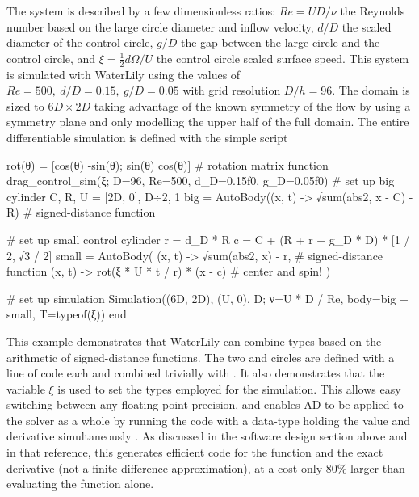 \documentclass[10pt,a4paper]{article}
\begin{document}
The system is described by a few dimensionless ratios: $Re=UD/\nu$ the Reynolds number based on the large circle diameter and inflow velocity, $d/D$ the scaled diameter of the control circle, $g/D$ the gap between the large circle and the control circle, and $\xi=\frac 12 d\Omega/U$ the control circle scaled surface speed. This system is simulated with WaterLily using the values of $Re=500,\ d/D=0.15,\ g/D=0.05$ with grid resolution $D/h=96$. The domain is sized to $6D\times2D$ taking advantage of the known symmetry of the flow by using a symmetry plane and only modelling the upper half of the full domain. The entire differentiable simulation is defined with the simple script

\begin{minipage}{\linewidth}\noindent
\begin{jllisting}
rot(θ) = [cos(θ) -sin(θ); sin(θ) cos(θ)] # rotation matrix
function drag_control_sim(ξ; D=96, Re=500, d_D=0.15f0, g_D=0.05f0)
    # set up big cylinder
    C, R, U = [2D, 0], D÷2, 1
    big = AutoBody((x, t) -> √sum(abs2, x - C) - R) # signed-distance function

    # set up small control cylinder
    r = d_D * R
    c = C + (R + r + g_D * D) * [1 / 2, √3 / 2]
    small = AutoBody(
        (x, t) -> √sum(abs2, x) - r,           # signed-distance function
        (x, t) -> rot(ξ * U * t / r) * (x - c) # center and spin!
    )

    # set up simulation
    Simulation((6D, 2D), (U, 0), D; ν=U * D / Re, body=big + small, T=typeof(ξ))
end
\end{jllisting}
\end{minipage}

This example demonstrates that WaterLily can combine  types based on the arithmetic of signed-distance functions. The two  and  circles are defined with a line of code each and combined trivially with . It also demonstrates that the variable $\xi$ is used to set the types employed for the simulation. This allows easy switching between any floating point precision, and enables AD to be applied to the solver as a whole by running the code with a  data-type holding the value and derivative simultaneously \citep{RevelsLubinPapamarkou2016}. As discussed in the software design section above and in that reference, this generates efficient code for the function and the exact derivative (not a finite-difference approximation), at a cost only 80\% larger than evaluating the function alone.
\end{document}
